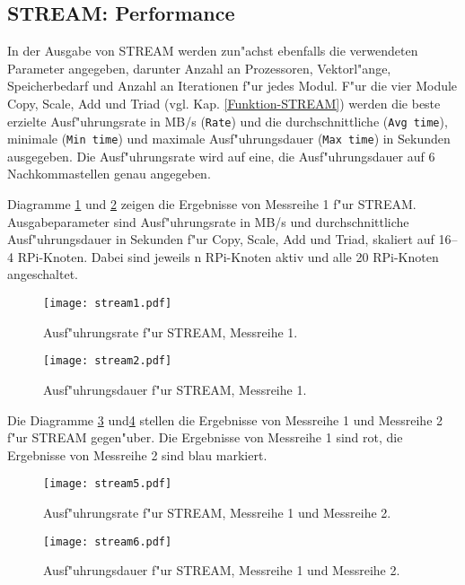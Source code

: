 \subsection{STREAM: Performance}\label{Ergebnisse-Stream}

In der Ausgabe von STREAM werden zun"achst ebenfalls die verwendeten Parameter angegeben, darunter Anzahl an Prozessoren, Vektorl"ange, Speicherbedarf und Anzahl an Iterationen f"ur jedes Modul. F"ur die vier Module Copy, Scale, Add und Triad (vgl. Kap. \ref{Funktion-STREAM}) werden die beste erzielte Ausf"uhrungsrate in MB/s (\texttt{Rate}) und die durchschnittliche (\texttt{Avg time}), minimale (\texttt{Min time}) und maximale Ausf"uhrungsdauer (\texttt{Max time}) in Sekunden ausgegeben. Die Ausf"uhrungsrate wird auf eine, die Ausf"uhrungsdauer auf 6 Nachkommastellen genau angegeben. 

Diagramme \ref{fig:stream1} und \ref{fig:stream2} zeigen die Ergebnisse von Messreihe 1 f"ur STREAM. Ausgabeparameter sind Ausf"uhrungsrate in MB/s und durchschnittliche Ausf"uhrungsdauer in Sekunden f"ur Copy, Scale, Add und Triad, skaliert auf 16--4 RPi-Knoten. Dabei sind jeweils n RPi-Knoten aktiv und alle 20 RPi-Knoten angeschaltet.  
\begin{figure}[htb]
  \centering
  \texttt{[image: stream1.pdf]}\\ 
  \caption{Ausf"uhrungsrate f"ur STREAM, Messreihe 1.}
  \label{fig:stream1}		
\end{figure}
\begin{figure}[htb]
  \centering
  \texttt{[image: stream2.pdf]}\\ 
  \caption{Ausf"uhrungsdauer f"ur STREAM, Messreihe 1.}
  \label{fig:stream2}		
\end{figure}
\noindent
Die Diagramme \ref{fig:stream5} und\ref{fig:stream6} stellen die Ergebnisse von Messreihe 1 und Messreihe 2 f"ur STREAM gegen"uber. Die Ergebnisse von Messreihe 1 sind rot, die Ergebnisse von Messreihe 2 sind blau markiert. 
\begin{figure}[htb]
  \centering
  \texttt{[image: stream5.pdf]}\\ 
  \caption{Ausf"uhrungsrate f"ur STREAM, Messreihe 1 und Messreihe 2.}\label{fig:stream5}
\end{figure}
\begin{figure}[htb]
  \centering
  \texttt{[image: stream6.pdf]}\\ 
  \caption{Ausf"uhrungsdauer f"ur STREAM, Messreihe 1 und Messreihe 2.}\label{fig:stream6}
\end{figure}

